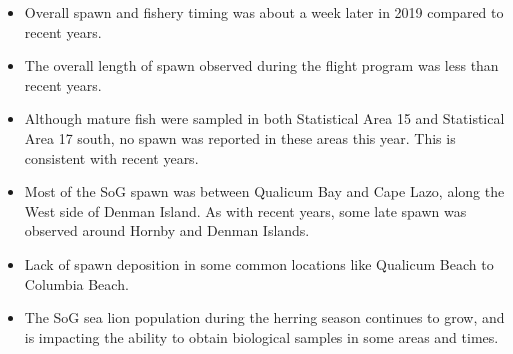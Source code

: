 \begin{itemize}
\item Overall spawn and fishery timing was about a week later in 2019 compared to recent years.
\item The overall length of spawn observed during the flight program was less than recent years.
\item Although mature fish were sampled in both Statistical Area 15 and Statistical Area 17 south, no spawn was reported in these areas this year.
This is consistent with recent years.
\item Most of the SoG spawn was between Qualicum Bay and Cape Lazo, along the West side of Denman Island.
As with recent years, some late spawn was observed around Hornby and Denman Islands.
\item Lack of spawn deposition in some common locations like Qualicum Beach to Columbia Beach.
\item The SoG sea lion population during the herring season continues to grow, and is impacting the ability to obtain biological samples in some areas and times.
\end{itemize}